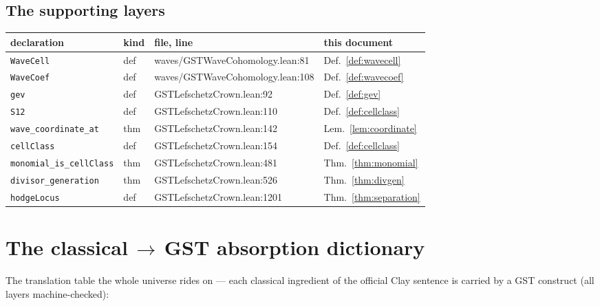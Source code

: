 \documentclass[11pt,a4paper]{article}
\theoremstyle{plain}
\theoremstyle{definition}
\begin{document}
\subsection{The supporting layers}
\begingroup\small
\begin{longtable}{@{}p{4.2cm}p{1.0cm}p{2.9cm}p{6.0cm}@{}}
\toprule
declaration & kind & file, line & this document \\
\midrule
\texttt{WaveCell} & def & waves/GSTWaveCohomology.lean:81 & Def.~\ref{def:wavecell} \\
\texttt{WaveCoef} & def & waves/GSTWaveCohomology.lean:108 & Def.~\ref{def:wavecoef} \\
\texttt{gev} & def & GSTLefschetzCrown.lean:92 & Def.~\ref{def:gev} \\
\texttt{S12} & def & GSTLefschetzCrown.lean:110 & Def.~\ref{def:cellclass} \\
\texttt{wave\_coordinate\_at} & thm & GSTLefschetzCrown.lean:142 & Lem.~\ref{lem:coordinate} \\
\texttt{cellClass} & def & GSTLefschetzCrown.lean:154 & Def.~\ref{def:cellclass} \\
\texttt{monomial\_is\_cellClass} & thm & GSTLefschetzCrown.lean:481 & Thm.~\ref{thm:monomial} \\
\texttt{divisor\_generation} & thm & GSTLefschetzCrown.lean:526 & Thm.~\ref{thm:divgen} \\
\texttt{hodgeLocus} & def & GSTLefschetzCrown.lean:1201 & Thm.~\ref{thm:separation} \\
\bottomrule
\end{longtable}
\endgroup

\section{The classical\,\texorpdfstring{$\to$}{->}\,GST absorption
dictionary}\label{app:absorption}

The translation table the whole universe rides on --- each classical
ingredient of the official Clay sentence is carried by a GST construct
(all layers machine-checked):
\end{document}
